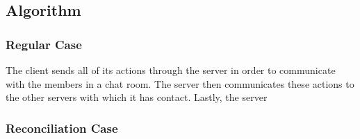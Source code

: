 \documentclass[12pt,journal,compsoc]{IEEEtran}
\begin{document}
\subsection{Algorithm}

\subsubsection{Regular Case}

The client sends all of its actions through the server in order to communicate with the members in a chat room. The server then communicates these actions to the other servers with which it has contact. Lastly, the server 
\subsubsection{Reconciliation Case}
\end{document}
